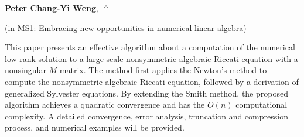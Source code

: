 \documentclass[ILAS2025-program.tex]{subfiles}
\begin{document}
\hypertarget{down0273}{}\begin{ilasabstract}
    
\textbf{Peter Chang-Yi Weng},  \hfill \hyperlink{up0273}{$\Uparrow$}
    
    
(in {\color{mstitle}MS1: Embracing new opportunities in numerical linear algebra})
        
\mtskip
    This paper presents an effective algorithm about a computation of the numerical
low-rank solution to a large-scale nonsymmetric algebraic Riccati equation with
a nonsingular $M$-matrix. The method first applies the Newton’s method to compute the nonsymmetric algebraic Riccati equation, followed by a derivation of
generalized Sylvester equations. By extending the Smith method, the proposed
algorithm achieves a quadratic convergence and has the $O(n)$ computational
complexity. A detailed convergence, error analysis, truncation and compression
process, and numerical examples will be provided.
\end{ilasabstract}
    
\end{document}
